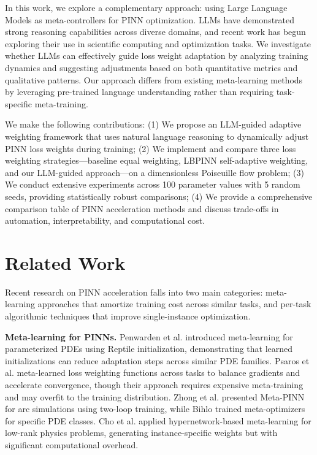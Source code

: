 \documentclass{article}
\begin{document}
In this work, we explore a complementary approach: using Large Language Models as meta-controllers for PINN optimization. LLMs have demonstrated strong reasoning capabilities across diverse domains, and recent work has begun exploring their use in scientific computing and optimization tasks. We investigate whether LLMs can effectively guide loss weight adaptation by analyzing training dynamics and suggesting adjustments based on both quantitative metrics and qualitative patterns. Our approach differs from existing meta-learning methods by leveraging pre-trained language understanding rather than requiring task-specific meta-training.

We make the following contributions: (1) We propose an LLM-guided adaptive weighting framework that uses natural language reasoning to dynamically adjust PINN loss weights during training; (2) We implement and compare three loss weighting strategies—baseline equal weighting, LBPINN self-adaptive weighting, and our LLM-guided approach—on a dimensionless Poiseuille flow problem; (3) We conduct extensive experiments across 100 parameter values with 5 random seeds, providing statistically robust comparisons; (4) We provide a comprehensive comparison table of PINN acceleration methods and discuss trade-offs in automation, interpretability, and computational cost.

\section{Related Work}

Recent research on PINN acceleration falls into two main categories: meta-learning approaches that amortize training cost across similar tasks, and per-task algorithmic techniques that improve single-instance optimization.

\textbf{Meta-learning for PINNs.} Penwarden et al. \citep{Penwarden2021MetalearningPINNs} introduced meta-learning for parameterized PDEs using Reptile initialization, demonstrating that learned initializations can reduce adaptation steps across similar PDE families. Psaros et al. \citep{Psaros2022MetaLoss} meta-learned loss weighting functions across tasks to balance gradients and accelerate convergence, though their approach requires expensive meta-training and may overfit to the training distribution. Zhong et al. \citep{Zhong2022MetaPINN} presented Meta-PINN for arc simulations using two-loop training, while Bihlo \citep{Bihlo2024MetaOpt} trained meta-optimizers for specific PDE classes. Cho et al. \citep{Cho2023HyperMetaPINN} applied hypernetwork-based meta-learning for low-rank physics problems, generating instance-specific weights but with significant computational overhead.
\end{document}
